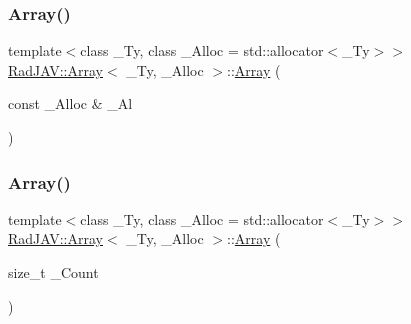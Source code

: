 \mbox{\label{class_rad_j_a_v_1_1_array_af317ba608afaa4c4de550dc3d3541680}} 
\subsubsection{\texorpdfstring{Array()}{Array()}\hspace{0.1cm}{\footnotesize\ttfamily [3/9]}}
{\footnotesize\ttfamily template$<$class \+\_\+\+Ty, class \+\_\+\+Alloc = std\+::allocator$<$\+\_\+\+Ty$>$$>$ \\
\mbox{\hyperlink{class_rad_j_a_v_1_1_array}{Rad\+J\+A\+V\+::\+Array}}$<$ \+\_\+\+Ty, \+\_\+\+Alloc $>$\+::\mbox{\hyperlink{class_rad_j_a_v_1_1_array}{Array}} (\begin{DoxyParamCaption}\item[{const \+\_\+\+Alloc \&}]{\+\_\+\+Al }\end{DoxyParamCaption})\hspace{0.3cm}{\ttfamily [inline]}}

\mbox{\label{class_rad_j_a_v_1_1_array_a68fc170aa12175c2229df3f9ac3444bf}} 
\subsubsection{\texorpdfstring{Array()}{Array()}\hspace{0.1cm}{\footnotesize\ttfamily [4/9]}}
{\footnotesize\ttfamily template$<$class \+\_\+\+Ty, class \+\_\+\+Alloc = std\+::allocator$<$\+\_\+\+Ty$>$$>$ \\
\mbox{\hyperlink{class_rad_j_a_v_1_1_array}{Rad\+J\+A\+V\+::\+Array}}$<$ \+\_\+\+Ty, \+\_\+\+Alloc $>$\+::\mbox{\hyperlink{class_rad_j_a_v_1_1_array}{Array}} (\begin{DoxyParamCaption}\item[{size\+\_\+t}]{\+\_\+\+Count }\end{DoxyParamCaption})\hspace{0.3cm}{\ttfamily [inline]}}

\mbox{\label{class_rad_j_a_v_1_1_array_a4a577ea07f40364674bbc60967214d7f}} 
